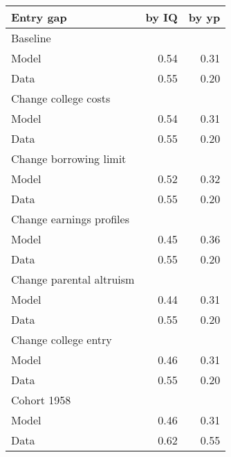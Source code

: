 \begin{tabular}{lrr}
\hline
Entry gap & by IQ  & by yp  \\ 
\hline
Baseline &   &   \\ 
Model & 0.54  & 0.31  \\ 
Data & 0.55  & 0.20  \\ 
Change college costs &   &   \\ 
Model & 0.54  & 0.31  \\ 
Data & 0.55  & 0.20  \\ 
Change borrowing limit &   &   \\ 
Model & 0.52  & 0.32  \\ 
Data & 0.55  & 0.20  \\ 
Change earnings profiles &   &   \\ 
Model & 0.45  & 0.36  \\ 
Data & 0.55  & 0.20  \\ 
Change parental altruism &   &   \\ 
Model & 0.44  & 0.31  \\ 
Data & 0.55  & 0.20  \\ 
Change college entry &   &   \\ 
Model & 0.46  & 0.31  \\ 
Data & 0.55  & 0.20  \\ 
Cohort 1958 &   &   \\ 
Model & 0.46  & 0.31  \\ 
Data & 0.62  & 0.55  \\ 
\hline
\end{tabular}%
